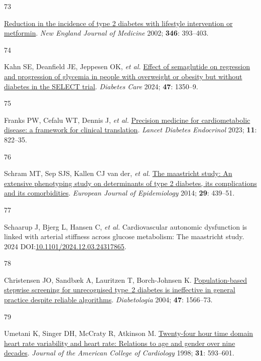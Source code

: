 \documentclass[
  a4paper,
  headsepline=true,
  open=left]{scrbook}
\newlength{\cslhangindent}
\newlength{\csllabelwidth}
\newlength{\cslentryspacingunit} %
\newenvironment{CSLReferences}[2] %
 {%
  \setlength{\parindent}{0pt}
  \ifodd #1
  \let\oldpar\par
  \def\par{\hangindent=\cslhangindent\oldpar}
  \fi
  \setlength{\parskip}{#2\cslentryspacingunit}
 }%
 {}
\newcommand{\CSLLeftMargin}[1]{\parbox[t]{\csllabelwidth}{#1}}
\newcommand{\CSLRightInline}[1]{\parbox[t]{\linewidth - \csllabelwidth}{#1}\break}
\begin{document}
\begin{CSLReferences}{0}{0}
\leavevmode{}%
\CSLLeftMargin{73 }%
\CSLRightInline{\href{https://doi.org/10.1056/NEJMoa012512}{Reduction in
the incidence of type 2 diabetes with lifestyle intervention or
metformin}. \emph{New England Journal of Medicine} 2002; \textbf{346}:
393--403.}

\leavevmode{}%
\CSLLeftMargin{74 }%
\CSLRightInline{Kahn SE, Deanfield JE, Jeppesen OK, \emph{et al.}
\href{https://doi.org/10.2337/dc24-0491}{Effect of semaglutide on
regression and progression of glycemia in people with overweight or
obesity but without diabetes in the SELECT trial}. \emph{Diabetes Care}
2024; \textbf{47}: 1350--9.}

\leavevmode{}%
\CSLLeftMargin{75 }%
\CSLRightInline{Franks PW, Cefalu WT, Dennis J, \emph{et al.}
\href{https://doi.org/10.1016/s2213-8587(23)00165-1}{Precision medicine
for cardiometabolic disease: a framework for clinical translation}.
\emph{Lancet Diabetes Endocrinol} 2023; \textbf{11}: 822--35.}

\leavevmode{}%
\CSLLeftMargin{76 }%
\CSLRightInline{Schram MT, Sep SJS, Kallen CJ van der, \emph{et al.}
\href{https://doi.org/10.1007/s10654-014-9889-0}{The maastricht study:
An extensive phenotyping study on determinants of type 2 diabetes, its
complications and its comorbidities}. \emph{European Journal of
Epidemiology} 2014; \textbf{29}: 439--51.}

\leavevmode{}%
\CSLLeftMargin{77 }%
\CSLRightInline{Schaarup J, Bjerg L, Hansen C, \emph{et al.}
Cardiovascular autonomic dysfunction is linked with arterial stiffness
across glucose metabolism: The maastricht study. 2024
DOI:\href{https://doi.org/10.1101/2024.12.03.24317865}{10.1101/2024.12.03.24317865}.}

\leavevmode{}%
\CSLLeftMargin{78 }%
\CSLRightInline{Christensen JO, Sandbæk A, Lauritzen T, Borch-Johnsen K.
\href{https://doi.org/10.1007/s00125-004-1496-2}{Population-based
stepwise screening for unrecognised type~2 diabetes is ineffective in
general practice despite reliable algorithms}. \emph{Diabetologia} 2004;
\textbf{47}: 1566--73.}

\leavevmode{}%
\CSLLeftMargin{79 }%
\CSLRightInline{Umetani K, Singer DH, McCraty R, Atkinson M.
\href{https://doi.org/10.1016/S0735-1097(97)00554-8}{Twenty-four hour
time domain heart rate variability and heart rate: Relations to age and
gender over nine decades}. \emph{Journal of the American College of
Cardiology} 1998; \textbf{31}: 593--601.}


\end{CSLReferences}
\end{document}

